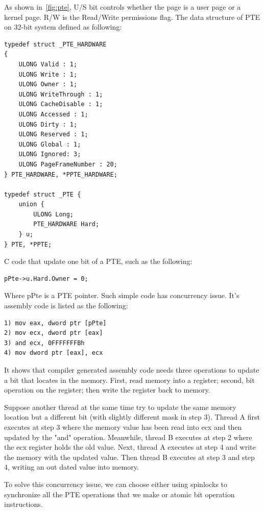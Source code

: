 As shown in~\autoref{fig:pte}, U/S bit controls whether the page is a user page or a kernel page. R/W is the Read/Write permissions flag. The data structure of PTE on 32-bit system defined as following:
\begin{lstlisting}[basicstyle=\small] 
typedef struct _PTE_HARDWARE
{
	ULONG Valid : 1;
	ULONG Write : 1;
	ULONG Owner : 1;
	ULONG WriteThrough : 1;
	ULONG CacheDisable : 1;
	ULONG Accessed : 1;
	ULONG Dirty : 1;
	ULONG Reserved : 1;
	ULONG Global : 1;
	ULONG Ignored: 3;
	ULONG PageFrameNumber : 20;
} PTE_HARDWARE, *PPTE_HARDWARE;

typedef struct _PTE {
	union {
		ULONG Long;
		PTE_HARDWARE Hard;
	} u;
} PTE, *PPTE;
\end{lstlisting}


C code that update one bit of a PTE, such as the following:

\begin{lstlisting}[basicstyle=\small] 
pPte->u.Hard.Owner = 0;
\end{lstlisting}

Where pPte is a PTE pointer. Such simple code has concurrency issue. It's assembly code is listed as the following:

\begin{lstlisting}[basicstyle=\small] 
1) mov eax, dword ptr [pPte]
2) mov ecx, dword ptr [eax]
3) and ecx, 0FFFFFFFBh
4) mov dword ptr [eax], ecx
\end{lstlisting}

It shows that compiler generated assembly code needs three operations to update a bit that locates in the memory. First, read memory into a register; second, bit operation on the register; then write the register back to memory.

Suppose another thread at the same time try to update the same memory location but a different bit (with slightly different mask in step 3). Thread A first executes at step 3 where the memory value has been read into ecx and then updated by the "and" operation. Meanwhile, thread B executes at step 2 where the ecx register holds the old value. Next, thread A executes at step 4 and write the memory with the updated value. Then thread B executes at step 3 and step 4, writing an out dated value into memory.

To solve this concurrency issue, we can choose either using spinlocks to synchronize all the PTE operations that we make or atomic bit operation instructions.

